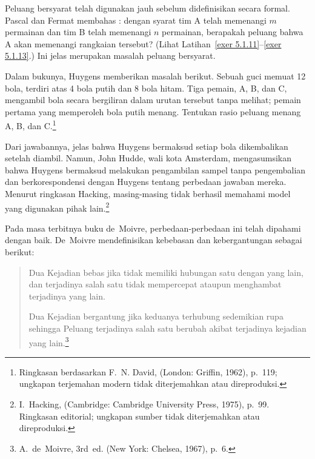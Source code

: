 Peluang bersyarat telah digunakan jauh sebelum didefinisikan secara formal.  Pascal dan Fermat
membahas : dengan syarat tim A telah memenangi $m$
permainan dan tim B telah memenangi $n$ permainan, berapakah peluang bahwa A akan memenangi rangkaian tersebut?  (Lihat
Latihan~\ref{exer 5.1.11}--\ref{exer 5.1.13}.)  Ini jelas merupakan masalah peluang
bersyarat.  
\par
Dalam bukunya, Huygens memberikan masalah berikut. Sebuah guci memuat
12 bola, terdiri atas 4 bola putih dan 8 bola hitam. Tiga pemain, A, B, dan C, mengambil bola
secara bergiliran dalam urutan tersebut tanpa melihat; pemain pertama yang memperoleh bola putih
menang. Tentukan rasio peluang menang A, B, dan C.\footnote{Ringkasan berdasarkan F.~N. David,
 (London: Griffin, 1962), p.~119; ungkapan terjemahan modern
tidak diterjemahkan atau direproduksi.}
\par
Dari jawabannya, jelas bahwa Huygens bermaksud setiap bola dikembalikan setelah
diambil.  Namun, John Hudde, wali kota Amsterdam, mengasumsikan bahwa Huygens bermaksud melakukan
pengambilan sampel tanpa pengembalian dan berkorespondensi dengan Huygens tentang perbedaan
jawaban mereka.  Menurut ringkasan Hacking, masing-masing tidak berhasil memahami model yang
digunakan pihak lain.\footnote{I.~Hacking, 
(Cambridge: Cambridge University Press, 1975), p.~99. Ringkasan editorial; ungkapan sumber
tidak diterjemahkan atau direproduksi.}
\par
Pada masa terbitnya buku de~Moivre,  perbedaan-perbedaan ini
telah dipahami dengan baik.  De~Moivre mendefinisikan kebebasan dan
kebergantungan sebagai berikut:
\begin{quote}
\indent Dua Kejadian bebas jika tidak memiliki hubungan satu dengan yang
lain, dan terjadinya salah satu tidak mempercepat ataupun menghambat
terjadinya yang lain.
\par
Dua Kejadian bergantung jika keduanya terhubung sedemikian rupa sehingga
Peluang terjadinya salah satu berubah akibat terjadinya kejadian yang
lain.\footnote{A.~de~Moivre,  3rd~ed. (New York:
Chelsea, 1967), p.~6.}
\end{quote}


